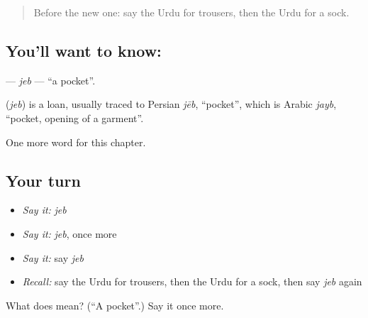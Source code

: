 \label{lesson:UR-C82-jeb}



\begin{quote}
Before the new one: say the Urdu for trousers, then the Urdu for a sock.
\end{quote}

\subsection*{You'll want to know: }
\textbf{} — \emph{jeb} — \textquotedblleft{}a pocket\textquotedblright{}.

\begin{cousinweb}
\textbf{} (\emph{jeb}) is a loan, usually traced to Persian \emph{jēb}, \textquotedblleft{}pocket\textquotedblright{}, which is Arabic \emph{jayb}, \textquotedblleft{}pocket, opening of a garment\textquotedblright{}.
\end{cousinweb}

\begin{grammarlens}[title={What you've built}]
One more word for this chapter.
\end{grammarlens}

\subsection*{Your turn}
\begin{itemize}
\raggedright
  \item \emph{Say it:} \emph{jeb}
  \item \emph{Say it:} \emph{jeb}, once more
  \item \emph{Say it:} say \emph{jeb}
  \item \emph{Recall:} say the Urdu for trousers, then the Urdu for a sock, then say \emph{jeb} again
\end{itemize}

\begin{tcolorbox}[breakable,colback=teal!4,colframe=teal!35!black,title={Before you move on}]
What does  mean? (\textquotedblleft{}A pocket\textquotedblright{}.) Say it once more.
\end{tcolorbox}
